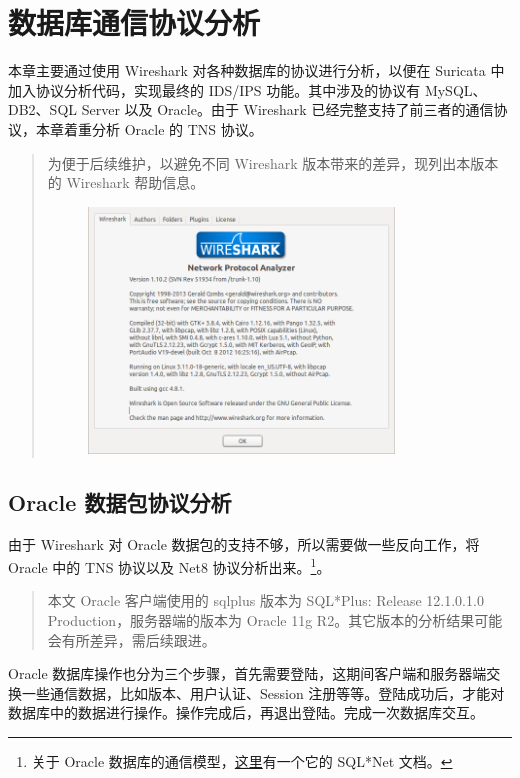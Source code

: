 \chapter{数据库通信协议分析}
本章主要通过使用 Wireshark 对各种数据库的协议进行分析，以便在 Suricata 中加入协议分析代码，实现最终的 IDS/IPS 功能。其中涉及的协议有 MySQL、DB2、SQL Server 以及 Oracle。由于 Wireshark 已经完整支持了前三者的通信协议，本章着重分析 Oracle 的 TNS 协议。

\begin{quote}
为便于后续维护，以避免不同 Wireshark 版本带来的差异，现列出本版本的 Wireshark 帮助信息。

\begin{figure}[h!]
    \centering
    \includegraphics[width=0.8\textwidth]{wireshark.png}
\end{figure}
\end{quote}

\section{Oracle 数据包协议分析}
由于 Wireshark 对 Oracle 数据包的支持不够，所以需要做一些反向工作，将 Oracle 中的 TNS 协议以及 Net8 协议分析出来。\footnote{关于 Oracle 数据库的通信模型，\href{http://docs.oracle.com/cd/A57673\_01/DOC/net/doc/NWUS233/ch2.htm}{这里}有一个它的 SQL*Net 文档。}。

\begin{quote}
    本文 Oracle 客户端使用的 sqlplus 版本为 {\ef SQL*Plus: Release 12.1.0.1.0 Production}，服务器端的版本为 {\ef Oracle 11g R2}。其它版本的分析结果可能会有所差异，需后续跟进。
\end{quote}

Oracle 数据库操作也分为三个步骤，首先需要登陆，这期间客户端和服务器端交换一些通信数据，比如版本、用户认证、Session 注册等等。登陆成功后，才能对数据库中的数据进行操作。操作完成后，再退出登陆。完成一次数据库交互。

